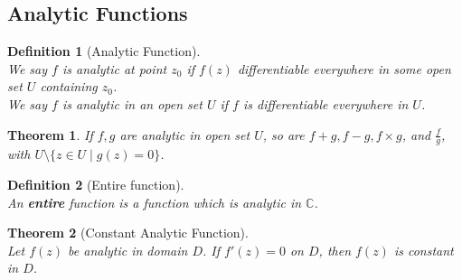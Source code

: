 \documentclass[12pt]{article}
\newtheorem{definition}{Definition}[section]
\newtheorem{theorem}{Theorem}[section]
\theoremstyle{definition}
\begin{document}
\subsection{Analytic Functions}
\begin{definition}[Analytic Function]
\hfill\\\normalfont We say $f$ is analytic at point $z_0$ if $f(z)$ differentiable everywhere in some open set $U$ containing $z_0$.\\
We say $f$ is analytic in an open set $U$ if $f$ is differentiable everywhere in $U$.
\end{definition}
\begin{theorem}\normalfont If $f,g$ are analytic in open set $U$, so are $f+g, f-g, f\times g$, and $\frac{f}{g}$, with $U\setminus \{z\in U\mid g(z)=0\}$.\end{theorem}
\begin{definition}[Entire function]
\hfill\\\normalfont An \textbf{entire} function is a function which is analytic in $\mathbb{C}$.
\end{definition}
\begin{theorem}[Constant Analytic Function]
\hfill\\\normalfont Let $f(z)$ be analytic in domain $D$. If $f'(z)=0$ on $D$, then $f(z)$ is constant in $D$.
\end{theorem}
\end{document}
